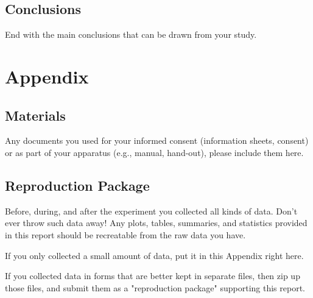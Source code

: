 \documentclass{article}
\begin{document}
\subsection{Conclusions}
End with the main conclusions that can be drawn from your study.

\section{Appendix}
\subsection{Materials}
Any documents you used for your informed consent (information sheets, consent) or as part of your apparatus (e.g., manual, hand-out), please include them here.

\subsection{Reproduction Package}
Before, during, and after the experiment you collected all kinds of data. Don't ever throw such data away! Any plots, tables, summaries, and statistics provided in this report should be recreatable from the raw data you have.

If you only collected a small amount of data, put it in this Appendix right here.

If you collected data in forms that are better kept in separate files, then zip up those files, and submit them as a "reproduction package" supporting this report.
\end{document}

